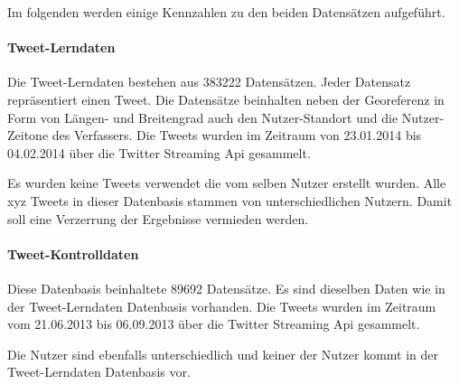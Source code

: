 		Im folgenden werden einige Kennzahlen zu den beiden Datensätzen aufgeführt.

		\paragraph{Tweet-Lerndaten} 

			Die Tweet-Lerndaten bestehen aus 383222 Datensätzen.
			Jeder Datensatz repräsentiert einen Tweet. 
			Die Datensätze beinhalten neben der Georeferenz in Form von Längen- und Breitengrad auch den Nutzer-Standort und die Nutzer-Zeitone des Verfassers.
			Die Tweets wurden im Zeitraum von 23.01.2014 bis 04.02.2014 über die Twitter Streaming Api gesammelt.

			Es wurden keine Tweets verwendet die vom selben Nutzer erstellt wurden. 
			Alle xyz Tweets in dieser Datenbasis stammen von unterschiedlichen Nutzern. 
			Damit soll eine Verzerrung der Ergebnisse vermieden werden.

		\paragraph{Tweet-Kontrolldaten}

			Diese Datenbasis beinhaltete 89692 Datensätze.
			Es sind dieselben Daten wie in der Tweet-Lerndaten Datenbasis vorhanden.
			Die Tweets wurden im Zeitraum vom 21.06.2013 bis 06.09.2013 über die Twitter Streaming Api gesammelt.

			Die Nutzer sind ebenfalls unterschiedlich und keiner der Nutzer kommt in der Tweet-Lerndaten Datenbasis vor.
